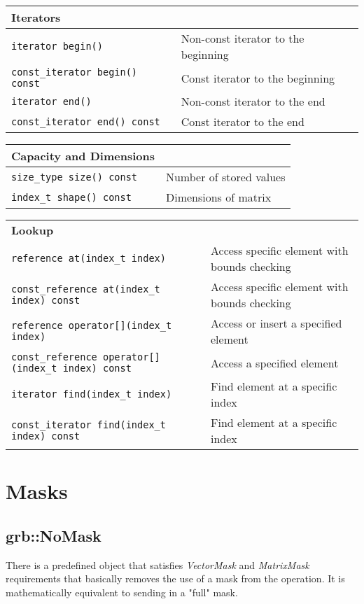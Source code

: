 \begin{tabularx}{\textwidth}{l X}
\textbf{Iterators}\\
\hline
\texttt{iterator begin()} & Non-const iterator to the beginning\\
\hline
\texttt{const\_iterator begin() const} & Const iterator to the beginning\\
\hline
\texttt{iterator end()} & Non-const iterator to the end\\
\hline
\texttt{const\_iterator end() const} & Const iterator to the end\\
\end{tabularx}

\begin{tabularx}{\textwidth}{l X}
\textbf{Capacity and Dimensions}\\
\hline
\texttt{size\_type size() const} & Number of stored values\\
\hline
\texttt{index\_t shape() const} & Dimensions of matrix\\
\end{tabularx}

\begin{tabularx}{\textwidth}{l X}
\textbf{Lookup}\\
\texttt{reference at(index\_t index)} & Access specific element with bounds checking\\
\hline
\texttt{const\_reference at(index\_t index) const} & Access specific element with bounds checking\\
\hline
\texttt{reference operator[](index\_t index)} & Access or insert a specified element\\
\hline
\texttt{const\_reference operator[](index\_t index) const} & Access a specified element\\
\hline
\texttt{iterator find(index\_t index)} & Find element at a specific index\\
\hline
\texttt{const\_iterator find(index\_t index) const} & Find element at a specific index\\
\end{tabularx}



\section{Masks}
\label{Sec:Masks}



\subsection{\sf grb::NoMask}

There is a predefined object that satisfies \textit{VectorMask} and \textit{MatrixMask}
requirements that basically removes the use of a mask from the operation. It
is mathematically equivalent to sending in a "full" mask.
